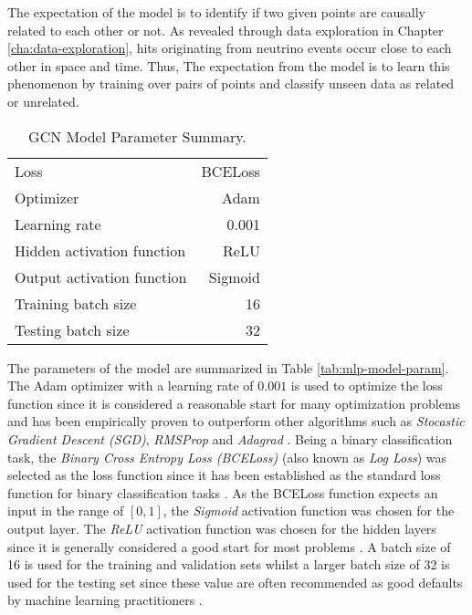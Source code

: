 The expectation of the model is to identify if two given points are
causally related to each other or not. As revealed through data
exploration in Chapter \ref{cha:data-exploration}, hits originating from
neutrino events occur close to each other in space and time. Thus, The
expectation from the model is to learn this phenomenon by training
over pairs of points and classify unseen data as related or unrelated.

\begin{table}[htb]
  \centering
  \begin{tabular}{lr}
    \hline
    Loss & BCELoss \\
    Optimizer & Adam \\
    Learning rate & 0.001 \\
    Hidden activation function & ReLU\\
    Output activation function & Sigmoid \\
    Training batch size & 16 \\
    Testing batch size & 32 \\
    \hline
  \end{tabular}
  \caption{GCN Model Parameter Summary.}
  \label{tab:gcn-model-param}
\end{table}

The parameters of the model are summarized in Table
\ref{tab:mlp-model-param}. The Adam optimizer with a learning rate of
$0.001$ is used to optimize the loss function since it is considered a
reasonable start for many optimization problems and has been
empirically proven to outperform other algorithms such as
\textit{Stocastic Gradient Descent (SGD)}, \textit{RMSProp} and
\textit{Adagrad} \cite{ruder2016overview}. Being a binary
classification task, the \textit{Binary Cross Entropy Loss (BCELoss)}
(also known as \textit{Log Loss}) was selected as the loss function
since it has been established as the standard loss function for binary
classification tasks \cite{painsky2018universality}. As the BCELoss
function expects an input in the range of $[0, 1]$, the
\textit{Sigmoid} activation function was chosen for the output layer.
The \textit{ReLU} activation function was chosen for the hidden layers
since it is generally considered a good start for most problems
\cite{nwankpa2018activation, wang2019learning}. A batch size of 16 is
used for the training and validation sets whilst a larger batch size
of 32 is used for the testing set since these value are often
recommended as good defaults by machine learning practitioners
\cite{bengio2012practical,Goodfellow-et-al-2016}.

